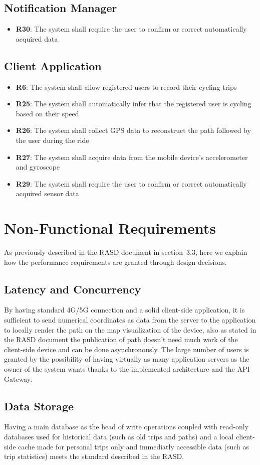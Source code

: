 \subsection*{Notification Manager}
\begin{itemize}
	\item \textbf{R30}: The system shall require the user to confirm or correct automatically acquired data
\end{itemize}

\subsection*{Client Application}
\begin{itemize}
	\item \textbf{R6}: The system shall allow registered users to record their cycling trips
	\item \textbf{R25}: The system shall automatically infer that the registered user is cycling based on their speed
	\item \textbf{R26}: The system shall collect GPS data to reconstruct the path followed by the user during the ride
	\item \textbf{R27}: The system shall acquire data from the mobile device’s accelerometer and gyroscope
	\item \textbf{R29}: The system shall require the user to confirm or correct automatically acquired sensor data
\end{itemize}

\section{Non-Functional Requirements}
As previously described in the RASD document in section~3.3, here we explain how the performance requirements are granted through design decisions.

\subsection{Latency and Concurrency}
By having standard 4G/5G connection and a solid client-side application, it is sufficient to send numerical coordinates as data from the server to the application to locally render the path on the map visualization of the device, also as stated in the RASD document the publication of path doesn't need much work of the client-side device and can be done asynchronously. The large number of users is granted by the possibility of having virtually as many application servers as the owner of the system wants thanks to the implemented architecture and the API Gateway.

\subsection{Data Storage}
Having a main database as the head of write operations coupled with read-only databases used for historical data (such as old trips and paths) and a local client-side cache made for personal trips only and immediatly accessible data (such as trip statistics) meets the standard described in the RASD.